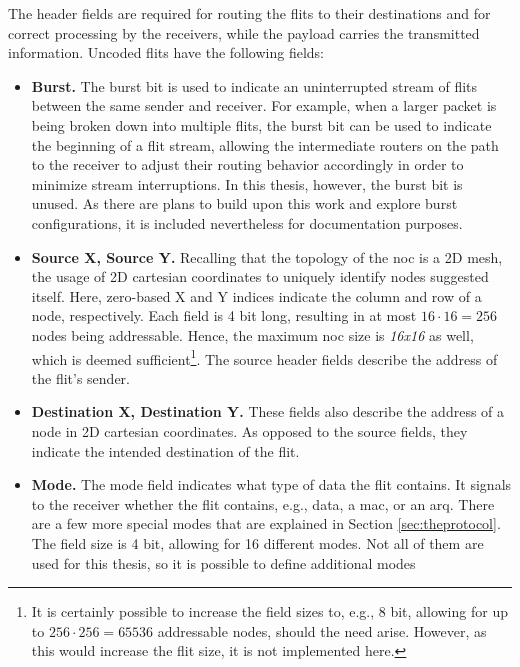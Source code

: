 The header fields are required for routing the flits to their destinations and for correct processing by the receivers, while the payload carries the
transmitted information. Uncoded flits have the following fields:
\begin{itemize}
    \item \textbf{Burst.} The burst bit is used to indicate an uninterrupted stream of flits between the same sender and receiver. For example, when a
        larger packet is being broken down into multiple flits, the burst bit can be used to indicate the beginning of a flit stream, allowing the
        intermediate routers on the path to the receiver to adjust their routing behavior accordingly in order to minimize stream interruptions. In
        this thesis, however, the burst bit is unused. As there are plans to build upon this work and explore burst configurations, it is included
        nevertheless for documentation purposes.
    \item \textbf{Source X, Source Y.} Recalling that the topology of the \gls{noc} is a 2D mesh, the usage of 2D cartesian coordinates to uniquely
        identify nodes suggested itself. Here, zero-based X and Y indices indicate the column and row of a node, respectively. Each field is 4 bit long,
        resulting in at most $16 \cdot 16 = 256$ nodes being addressable. Hence, the maximum \gls{noc} size is \textit{16x16} as well, which is deemed
        sufficient\footnote{It is certainly possible to increase the field sizes to, e.g., 8 bit, allowing for up to $256 \cdot 256 = 65536$ addressable
        nodes, should the need arise. However, as this would increase the flit size, it is not implemented here.}. The source header fields describe
        the address of the flit's sender.%
    \item \textbf{Destination X, Destination Y.} These fields also describe the address of a node in 2D cartesian coordinates. As opposed to the
        source fields, they indicate the intended destination of the flit.
    \item \textbf{Mode.} The mode field indicates what type of data the flit contains. It signals to the receiver whether the flit contains, e.g.,
        data, a \gls{mac}, or an \gls{arq}. There are a few more special modes that are explained in Section \ref{sec:theprotocol}. The
        field size is 4 bit, allowing for 16 different modes. Not all of them are used for this thesis, so it is possible to define additional modes

\end{itemize}
